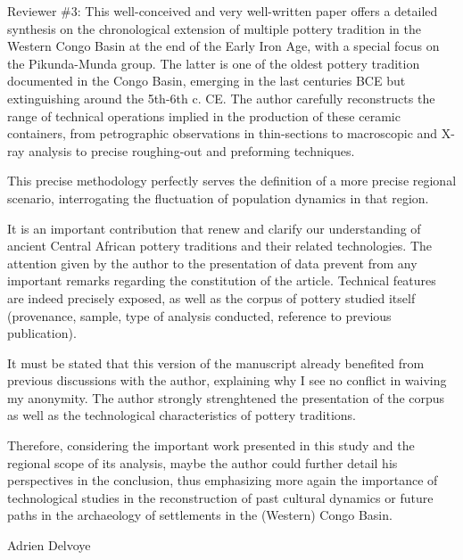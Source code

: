 \begin{reviewer}

Reviewer \#3: This well-conceived and very well-written paper offers a detailed synthesis on the chronological extension of multiple pottery tradition in the Western Congo Basin at the end of the Early Iron Age, with a special focus on the Pikunda-Munda group. The latter is one of the oldest pottery tradition documented in the Congo Basin, emerging in the last centuries BCE but extinguishing around the 5th-6th c. CE. The author carefully reconstructs the range of technical operations implied in the production of these ceramic containers, from petrographic observations in thin-sections to macroscopic and X-ray analysis to precise roughing-out and preforming techniques.

This precise methodology perfectly serves the definition of a more precise regional scenario, interrogating the fluctuation of population dynamics in that region.

It is an important contribution that renew and clarify our understanding of ancient Central African pottery traditions and their related technologies. The attention given by the author to the presentation of data prevent from any important remarks regarding the constitution of the article. Technical features are indeed precisely exposed, as well as the corpus of pottery studied itself (provenance, sample, type of analysis conducted, reference to previous publication).

It must be stated that this version of the manuscript already benefited from previous discussions with the author, explaining why I see no conflict in waiving my anonymity. The author strongly strenghtened the presentation of the corpus as well as the technological characteristics of pottery traditions.

Therefore, considering the important work presented in this study and the regional scope of its analysis, maybe the author could further detail his perspectives in the conclusion, thus emphasizing more again the importance of technological studies in the reconstruction of past cultural dynamics or future paths in the archaeology of settlements in the (Western) Congo Basin.

Adrien Delvoye


\end{reviewer}

%



